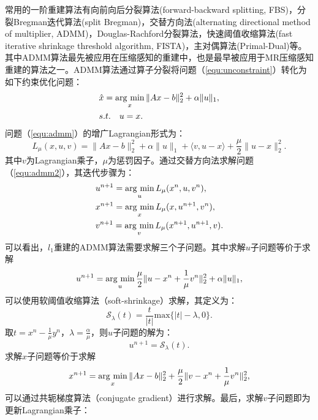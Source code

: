 常用的一阶重建算法有向前向后分裂算法(forward-backward splitting\cite{fbs}, FBS)，分裂Bregman迭代算法(split Bregman\cite{sb})，交替方向法(alternating directional method of multiplier\cite{admm,ramani2010parallel,boyd2011distributed,yang2011alternating}, ADMM)，Douglas-Rachford分裂算法\cite{dr}，快速阈值收缩算法(fast iterative shrinkage threshold algorithm\cite{fista}, FISTA)，主对偶算法(Primal-Dual\cite{pd})等。其中ADMM算法最先被应用在压缩感知的重建中，也是最早被应用于MR压缩感知重建的算法之一。ADMM算法通过算子分裂将问题（\ref{equ:unconstraint}）转化为如下约束优化问题：
\begin{equation}
\begin{aligned}
	&\hat{x}=\argmin_x \|Ax-b\|_2^2 + \alpha\|u\|_1,\\
	& s.t. \quad u=x.
\end{aligned}
\label{equ:admm}
\end{equation}
问题（\ref{equ:admm}）的增广Lagrangian形式为：
\begin{equation}
	L_\mu(x,u,v)=\|Ax-b\|^2_2+\alpha\|u\|_1+\langle v,u-x\rangle +\frac{\mu}{2}\|u-x\|_2^2.
\label{equ:admm2}
\end{equation}
其中$v$为Lagrangian乘子，$\mu$为惩罚因子。通过交替方向法求解问题（\ref{equ:admm2}），其迭代步骤为：
\begin{equation}
	\begin{aligned}
		& u^{n+1}=\argmin_u L_\mu(x^n,u,v^n),\\
		& x^{n+1}=\argmin_x L_\mu(x,u^{n+1},v^n),\\
		& v^{n+1}=\argmin_v L_\mu(x^{n+1},u^{n+1},v).
	\end{aligned}
	\label{equ:admm3}
\end{equation}
可以看出，$l_1$重建的ADMM算法需要求解三个子问题。其中求解$u$子问题等价于求解
$$u^{n+1}=\argmin_u \frac{\mu}{2}\|u-x^n+\frac{1}{\mu}v^n\|_2^2+\alpha\|u\|_1,$$
可以使用软阈值收缩算法（soft-shrinkage）求解，其定义为：
$$\mathscr{S}_\lambda(t)=\frac{t}{|t|}\mathrm{max}\{|t|-\lambda,0\}.$$
取$t=x^n-\frac{1}{\mu}y^{n}$，$\lambda=\frac{\alpha}{\mu}$，则$u$子问题的解为：
\begin{equation}
	u^{n+1}=\mathscr{S}_\lambda(t).
	\label{equ:admmu}
\end{equation}
求解$x$子问题等价于求解
\begin{equation}
	x^{n+1}=\argmin_x \|Ax-b\|^2_2+\frac{\mu}{2}\|v-x^n+\frac{1}{\mu}v^n\|_2^2,
	\label{equ:admmx}
\end{equation}
可以通过共轭梯度算法\cite{powell1977restart}（conjugate gradient）进行求解。最后，求解$v$子问题即为更新Lagrangian乘子：
